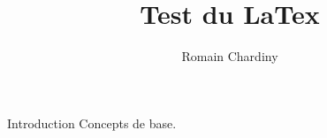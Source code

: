 \documentclass{beamer}
\title{Test du LaTex}
\author{Romain Chardiny}
\begin{document}
  \begin{frame}
    \titlepage
  \end{frame}

  \begin{frame}{Introduction}
    Concepts de base.
  \end{frame}
\end{document}
